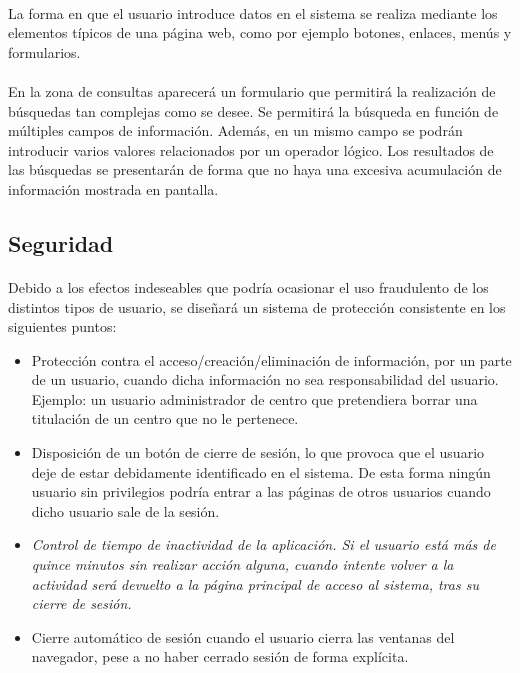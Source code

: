   \paragraph{}La forma en que el usuario introduce datos en el sistema se
  realiza mediante los elementos típicos de una página web, como por ejemplo
  botones, enlaces, menús y formularios.

  \paragraph{}En la zona de consultas aparecerá un formulario que permitirá la
  realización de búsquedas tan complejas como se desee. Se permitirá la búsqueda
  en función de múltiples campos de información. Además, en un mismo campo se
  podrán introducir varios valores relacionados por un operador lógico. Los
  resultados de las búsquedas se presentarán de forma que no haya una excesiva
  acumulación de información mostrada en pantalla.

  \subsection{Seguridad}

  \paragraph{}Debido a los efectos indeseables que podría ocasionar el uso
  fraudulento de los distintos tipos de usuario, se diseñará un sistema de
  protección consistente en los siguientes puntos:

  \begin{itemize}
   \item Protección contra el acceso/creación/eliminación de información, por
   un parte de un usuario, cuando dicha información no sea responsabilidad del
   usuario. Ejemplo: un usuario administrador de centro que pretendiera borrar
   una titulación de un centro que no le pertenece.
   \item Disposición de un botón de cierre de sesión, lo que provoca que el
   usuario deje de estar debidamente identificado en el sistema. De esta forma
   ningún usuario sin privilegios podría entrar a las páginas de otros usuarios
   cuando dicho usuario sale de la sesión.
   \item \textit{Control de tiempo de inactividad de la aplicación. Si el
   usuario está más de quince minutos sin realizar acción alguna, cuando intente
   volver a la actividad será devuelto a la página principal de acceso al
   sistema, tras su cierre de sesión.}
   \item Cierre automático de sesión cuando el usuario cierra las ventanas
   del navegador, pese a no haber cerrado sesión de forma explícita.
  \end{itemize}

